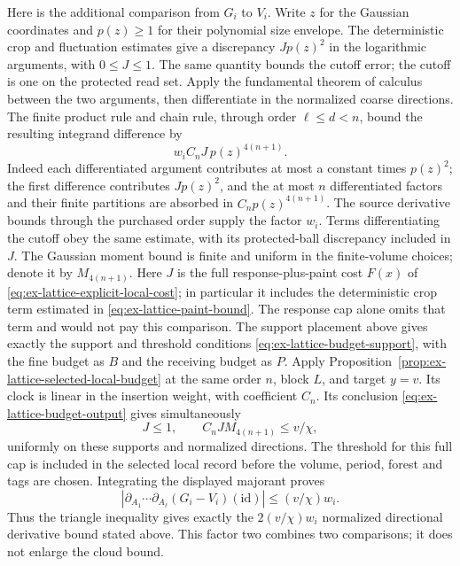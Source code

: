 Here is the additional comparison from $G_i$ to $V_i$. Write $z$ for the
Gaussian coordinates and $p(z)\ge1$ for their polynomial size envelope.
The deterministic crop and fluctuation estimates give a discrepancy
$Jp(z)^2$ in the logarithmic arguments, with $0\le J\le1$. The same
quantity bounds the cutoff error; the cutoff is one on the protected
read set. Apply the fundamental theorem of calculus between the two
arguments, then differentiate in the normalized coarse directions. The
finite product rule and chain rule, through order $\ell\le d<n$, bound
the resulting integrand difference by
\[
 w_i C_n J\,p(z)^{4(n+1)}.
\]
Indeed each differentiated argument contributes at most a constant times
$p(z)^2$; the first difference contributes $Jp(z)^2$, and the at most
$n$ differentiated factors and their finite partitions are absorbed in
$C_n p(z)^{4(n+1)}$. The source derivative bounds through the purchased
order supply the factor $w_i$. Terms differentiating the cutoff obey the
same estimate, with its protected-ball discrepancy included in $J$.
The Gaussian moment bound is finite and uniform in the finite-volume
choices; denote it by $M_{4(n+1)}$. Here $J$ is the full response-plus-paint cost $F(x)$ of
\eqref{eq:ex-lattice-explicit-local-cost}; in particular it includes
the deterministic crop term estimated in
\eqref{eq:ex-lattice-paint-bound}. The response cap alone omits that term
and would not pay this comparison. The support placement above gives
exactly the support and threshold conditions
\eqref{eq:ex-lattice-budget-support}, with the fine budget as $B$ and
the receiving budget as $P$. Apply
Proposition~\ref{prop:ex-lattice-selected-local-budget} at the same order
$n$, block $L$, and target $y=v$. Its clock is linear in the insertion
weight, with coefficient $C_n$. Its conclusion
\eqref{eq:ex-lattice-budget-output} gives simultaneously
\[
 J\le1,\qquad C_nJ M_{4(n+1)}\le v/\chi,
\]
uniformly on these supports and normalized directions. The threshold for
this full cap is included in the selected local record before the volume,
period, forest and tags are chosen. Integrating the displayed majorant proves
\[
 |\partial_{A_1}\cdots\partial_{A_\ell}(G_i-V_i)(\mathrm{id})|
       \le(v/\chi)w_i.
\]
Thus the triangle inequality gives exactly the $2(v/\chi)w_i$ normalized
directional derivative bound stated above. This factor two combines two
comparisons; it does not enlarge the cloud bound.

